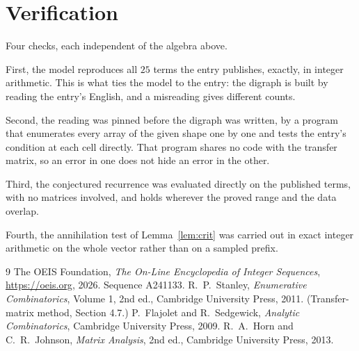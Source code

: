 \documentclass[11pt,a4paper]{article}
\theoremstyle{plain}
\theoremstyle{definition}
\begin{document}
\section{Verification}

Four checks, each independent of the algebra above.

First, the model reproduces all $25$ terms the entry publishes, exactly, in integer
arithmetic. This is what ties the model to the entry: the digraph is built by reading the
entry's English, and a misreading gives different counts.

Second, the reading was pinned before the digraph was written, by a program that enumerates
every array of the given shape one by one and tests the entry's condition at each cell
directly. That program shares no code with the transfer matrix, so an error in one does not
hide an error in the other.

Third, the conjectured recurrence was evaluated directly on the published terms, with no
matrices involved, and holds wherever the proved range and the data overlap.

Fourth, the annihilation test of Lemma~\ref{lem:crit} was carried out in exact integer
arithmetic on the whole vector rather than on a sampled prefix.

\begin{thebibliography}{9}
 The OEIS Foundation, \emph{The On-Line Encyclopedia of Integer
Sequences}, \url{https://oeis.org}, 2026. Sequence A241133.
 R.~P.~Stanley, \emph{Enumerative Combinatorics}, Volume 1, 2nd ed.,
Cambridge University Press, 2011. (Transfer-matrix method, Section 4.7.)
 P.~Flajolet and R.~Sedgewick, \emph{Analytic Combinatorics}, Cambridge
University Press, 2009.
 R.~A.~Horn and C.~R.~Johnson, \emph{Matrix Analysis}, 2nd ed., Cambridge
University Press, 2013.
\end{thebibliography}
\end{document}

